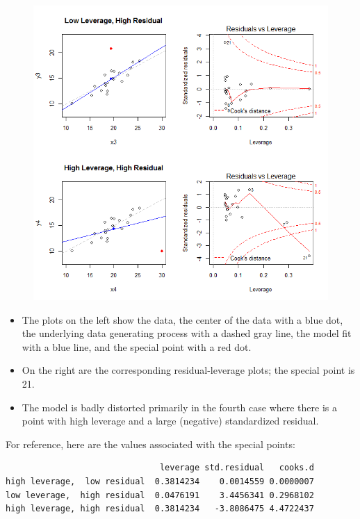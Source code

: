 \documentclass[residuals.tex]{subfiles}
\begin{document}
\begin{figure}[h!]
\centering
\includegraphics[width=1.0\linewidth]{plots3}
\caption{}
\label{fig:plots3}
\end{figure}
\newpage
\begin{itemize}
\item The plots on the left show the data, the center of the data  with a blue dot, the underlying data generating process with a dashed gray line, the model fit with a blue line, and the special point with a red dot. 
\item On the right are the corresponding residual-leverage plots; the special point is 21. 
\item The model is badly distorted primarily in the fourth case where there is a point with high leverage and a large (negative) standardized residual. 

\end{itemize}
\newpage
For reference, here are the values associated with the special points:
\begin{verbatim}
                               leverage std.residual   cooks.d
high leverage,  low residual  0.3814234    0.0014559 0.0000007
low leverage,  high residual  0.0476191    3.4456341 0.2968102
high leverage, high residual  0.3814234   -3.8086475 4.4722437
\end{verbatim}
\end{document}
